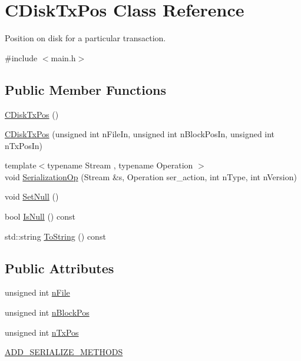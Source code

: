 \hypertarget{class_c_disk_tx_pos}{}\section{C\+Disk\+Tx\+Pos Class Reference}
\label{class_c_disk_tx_pos}


Position on disk for a particular transaction.  




{\ttfamily \#include $<$main.\+h$>$}

\subsection*{Public Member Functions}
\begin{DoxyCompactItemize}
\item 
\hyperlink{class_c_disk_tx_pos_a2026598d28ffcadfd40452f702bcac46}{C\+Disk\+Tx\+Pos} ()
\item 
\hyperlink{class_c_disk_tx_pos_a2cf11e1b0c8154be066b2d58caddb468}{C\+Disk\+Tx\+Pos} (unsigned int n\+File\+In, unsigned int n\+Block\+Pos\+In, unsigned int n\+Tx\+Pos\+In)
\item 
{\footnotesize template$<$typename Stream , typename Operation $>$ }\\void \hyperlink{class_c_disk_tx_pos_a1a68f1de894f0791a7ad64e3e6ea6fd6}{Serialization\+Op} (Stream \&s, Operation ser\+\_\+action, int n\+Type, int n\+Version)
\item 
void \hyperlink{class_c_disk_tx_pos_a22eb47d077f9c355373772eb42853fcf}{Set\+Null} ()
\item 
bool \hyperlink{class_c_disk_tx_pos_ae4bdd4eba8a9712dba1b4216559f11df}{Is\+Null} () const 
\item 
std\+::string \hyperlink{class_c_disk_tx_pos_ada1de4b95f6be78bd290c28bcb8628a5}{To\+String} () const 
\end{DoxyCompactItemize}
\subsection*{Public Attributes}
\begin{DoxyCompactItemize}
\item 
unsigned int \hyperlink{class_c_disk_tx_pos_a07198e7b96d4c60ece4d895abbd46104}{n\+File}
\item 
unsigned int \hyperlink{class_c_disk_tx_pos_ae9b3c262149c035be43010cbf7d1423b}{n\+Block\+Pos}
\item 
unsigned int \hyperlink{class_c_disk_tx_pos_ad86f9cef782e44a0e5bfe1fae9ed6593}{n\+Tx\+Pos}
\item 
\hyperlink{class_c_disk_tx_pos_a2990c083fbbd0fb5f5aa4115e540cd21}{A\+D\+D\+\_\+\+S\+E\+R\+I\+A\+L\+I\+Z\+E\+\_\+\+M\+E\+T\+H\+O\+D\+S}
\end{DoxyCompactItemize}
